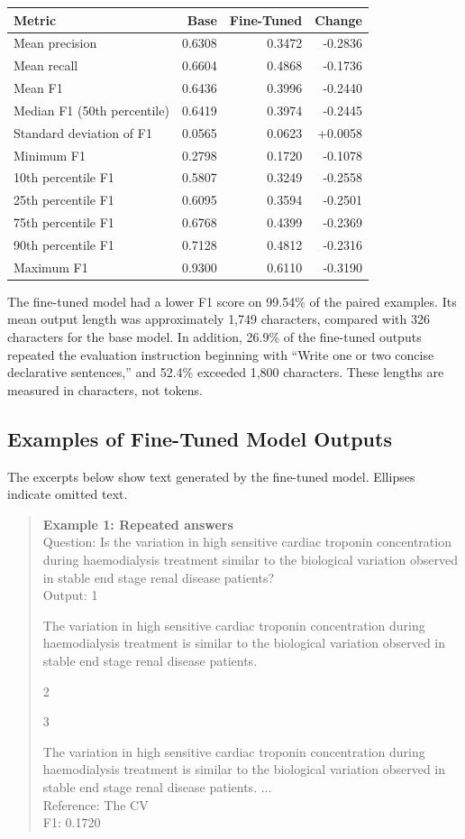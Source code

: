 \begin{center}
\begin{tabular}{lrrr}
\hline
\textbf{Metric} & \textbf{Base} & \textbf{Fine-Tuned} & \textbf{Change} \\
\hline
Mean precision & 0.6308 & 0.3472 & -0.2836 \\
Mean recall & 0.6604 & 0.4868 & -0.1736 \\
Mean F1 & 0.6436 & 0.3996 & -0.2440 \\
Median F1 (50th percentile) & 0.6419 & 0.3974 & -0.2445 \\
Standard deviation of F1 & 0.0565 & 0.0623 & +0.0058 \\
Minimum F1 & 0.2798 & 0.1720 & -0.1078 \\
10th percentile F1 & 0.5807 & 0.3249 & -0.2558 \\
25th percentile F1 & 0.6095 & 0.3594 & -0.2501 \\
75th percentile F1 & 0.6768 & 0.4399 & -0.2369 \\
90th percentile F1 & 0.7128 & 0.4812 & -0.2316 \\
Maximum F1 & 0.9300 & 0.6110 & -0.3190 \\
\hline
\end{tabular}
\end{center}

The fine-tuned model had a lower F1 score on 99.54\% of the paired examples. Its mean output length was approximately 1,749 characters, compared with 326 characters for the base model. In addition, 26.9\% of the fine-tuned outputs repeated the evaluation instruction beginning with ``Write one or two concise declarative sentences,'' and 52.4\% exceeded 1,800 characters. These lengths are measured in characters, not tokens.

\subsection{Examples of Fine-Tuned Model Outputs}

The excerpts below show text generated by the fine-tuned model. Ellipses indicate omitted text.

\begin{quote}
\textbf{Example 1: Repeated answers}\\
Question: Is the variation in high sensitive cardiac troponin concentration during haemodialysis treatment similar to the biological variation observed in stable end stage renal disease patients?\\
Output: 1

The variation in high sensitive cardiac troponin concentration during haemodialysis treatment is similar to the biological variation observed in stable end stage renal disease patients.

2

3

The variation in high sensitive cardiac troponin concentration during haemodialysis treatment is similar to the biological variation observed in stable end stage renal disease patients. ...\\
Reference: The CV\\
F1: 0.1720
\end{quote}

